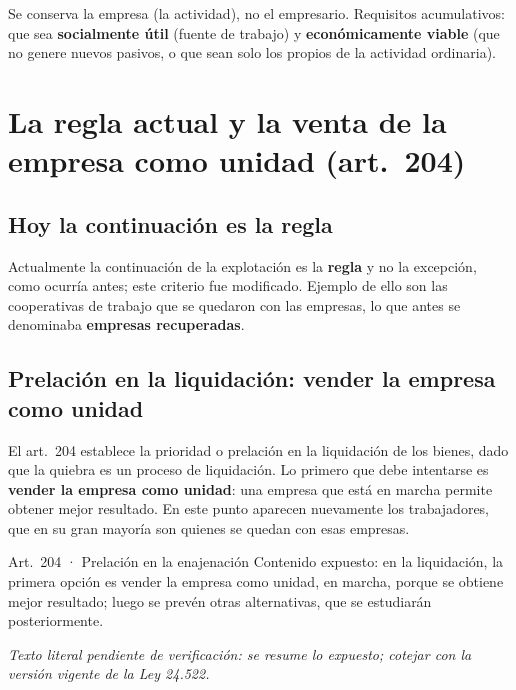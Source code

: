 \documentclass[12pt,oneside]{book}
\begin{document}
\begin{important}
Se conserva la empresa (la actividad), no el empresario. Requisitos acumulativos: que sea \textbf{socialmente útil} (fuente de trabajo) y \textbf{económicamente viable} (que no genere nuevos pasivos, o que sean solo los propios de la actividad ordinaria).
\end{important}

\section{La regla actual y la venta de la empresa como unidad (art.~204)}

\subsection{Hoy la continuación es la regla}

Actualmente la continuación de la explotación es la \textbf{regla} y no la excepción, como ocurría antes; este criterio fue modificado. Ejemplo de ello son las cooperativas de trabajo que se quedaron con las empresas, lo que antes se denominaba \textbf{empresas recuperadas}.

\subsection{Prelación en la liquidación: vender la empresa como unidad}

El art.~204 establece la prioridad o prelación en la liquidación de los bienes, dado que la quiebra es un proceso de liquidación. Lo primero que debe intentarse es \textbf{vender la empresa como unidad}: una empresa que está en marcha permite obtener mejor resultado. En este punto aparecen nuevamente los trabajadores, que en su gran mayoría son quienes se quedan con esas empresas.

\begin{norma}{Art.~204 · Prelación en la enajenación}
Contenido expuesto: en la liquidación, la primera opción es vender la empresa como unidad, en marcha, porque se obtiene mejor resultado; luego se prevén otras alternativas, que se estudiarán posteriormente.

\par\smallskip\textit{Texto literal pendiente de verificación: se resume lo expuesto; cotejar con la versión vigente de la Ley 24.522.}
\end{norma}
\end{document}
